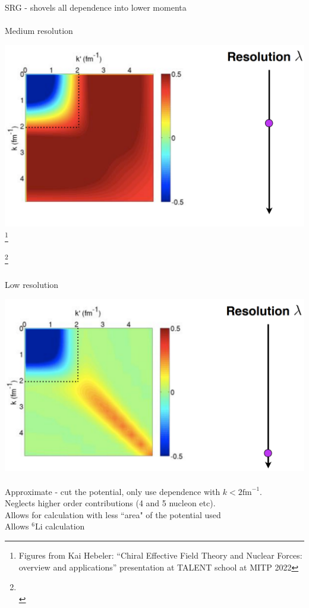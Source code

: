 \documentclass{beamer}
\newcommand{\LiS}{{}^{6} \mathrm{Li} }
\newcommand\footn[1]{%
  \begingroup
  \renewcommand\thefootnote{}\footnote{#1}%
  \addtocounter{footnote}{-1}%
  \endgroup
}
\begin{document}
\begin{frame}\frametitle{}
\begin{center}
    SRG - shovels all dependence into lower momenta\\~\\
    Medium resolution 
\end{center}
\includegraphics[scale=0.4]{MedRes.png}
\footn{Figures from Kai Hebeler: ``Chiral Effective Field Theory and Nuclear Forces:
overview and applications'' presentation at TALENT school at MITP 2022}
\footn{~\\}
\end{frame}




\begin{frame}\frametitle{}
\begin{center}
    Low resolution
\end{center}
\includegraphics[scale=0.35]{HighRes.png}
~\\
Approximate - cut the potential, only use dependence with $k<2 \mathrm{fm}^{-1}$.\\
Neglects higher order contributions (4 and 5 nucleon etc).\\
Allows for calculation with less ``area" of the potential used\\
Allows $\LiS$ calculation
\end{frame}
\end{document}
